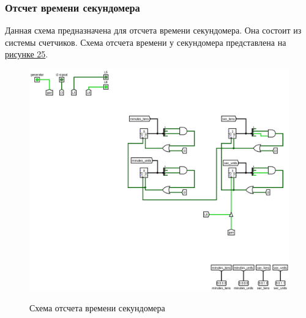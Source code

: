 \documentclass[10pt,a4paper,final]{article} %
\begin{document}
\subsubsection{Отсчет времени секундомера}
Данная схема предназначена для отсчета времени секундомера. Она состоит из системы счетчиков.  
Схема отсчета времени у секундомера представлена на \hyperref[SW]{рисунке 25}.
\newpage
\begin{figure}[htpb]
	\centering
	\includegraphics[scale=0.4]{logisim/img/SW.png}
	\label{SW} 
	\caption{Схема отсчета времени секундомера }
\end{figure}
\end{document}
